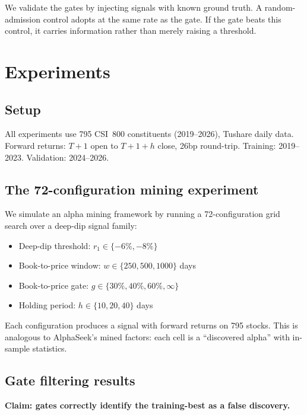 \documentclass[11pt]{article}
\begin{document}
We validate the gates by injecting signals with known ground truth. A
random-admission control adopts at the same rate as the gate. If the gate
beats this control, it carries information rather than merely raising a
threshold.


\section{Experiments}
\label{sec:experiments}

\subsection{Setup}

All experiments use 795 CSI~800 constituents (2019--2026), Tushare daily
data. Forward returns: $T{+}1$ open to $T{+}1{+}h$ close, 26bp round-trip.
Training: 2019--2023. Validation: 2024--2026.

\subsection{The 72-configuration mining experiment}
\label{sec:grid}

We simulate an alpha mining framework by running a 72-configuration grid
search over a deep-dip signal family:

\begin{itemize}
\item Deep-dip threshold: $r_1 \in \{-6\%, -8\%\}$
\item Book-to-price window: $w \in \{250, 500, 1000\}$ days
\item Book-to-price gate: $g \in \{30\%, 40\%, 60\%, \infty\}$
\item Holding period: $h \in \{10, 20, 40\}$ days
\end{itemize}

Each configuration produces a signal with forward returns on 795 stocks.
This is analogous to AlphaSeek's mined factors: each cell is a ``discovered
alpha'' with in-sample statistics.

\subsection{Gate filtering results}
\label{sec:gatetest}

\textbf{Claim: gates correctly identify the training-best as a false discovery.}
\end{document}
